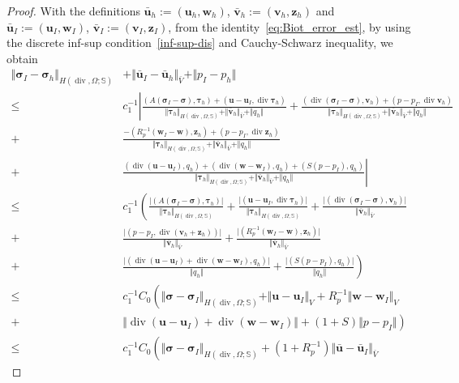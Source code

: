 \documentclass[10pt,a4paper]{amsart}
\def\btau{{\bm \tau}}
\def\bu{{\boldsymbol u}}
\def\bv{{\boldsymbol v}}
\def\bw{{\boldsymbol w}}
\def\bz{\boldsymbol z}
\renewcommand{\div}{\operatorname{div}}
\def\sig{{\bm \sigma}}
\begin{document}
\begin{proof}
With the definitions $\bar{\bu}_h :=(\bu_h,\bw_h)$, $\bar{\bv}_h :=(\bv_h,\bz_h)$ and $\bar{\bu}_I :=(\bu_I,\bw_I)$, $\bar{\bv}_I :=(\bv_I,\bz_I)$, from the identity~\eqref{eq:Biot_error_est}, by using the discrete inf-sup condition~\eqref{inf-sup-dis} and Cauchy-Schwarz inequality, we obtain
%
\begin{align*}
\Vert \sig_I - \sig_h \Vert_{H(\div,\Omega;\mathbb{S})} &+ \Vert \bar{\bu}_I - \bar{\bu}_h \Vert_{\bar{V}} +  \Vert p_I - p_h \Vert \\
\le &
c_1^{-1} \left\lvert
\frac{(A (\sig_I-\sig), \bm \tau_h) + (\bu-\bu_I,\div \bm \tau_h)}
{\Vert \btau_h \Vert_{H(\div,\Omega;\mathbb{S})}+ \Vert \bar{\bv}_h \Vert_{\bar{V}} + \Vert q_h \Vert} \right. 
+  \frac{(\div (\sig_I-\sig),\bv_h) + (p-p_I, \div \bv_h)}
{\Vert \btau_h \Vert_{H(\div,\Omega;\mathbb{S})}+ \Vert \bar{\bv}_h \Vert_{\bar{V}} + \Vert q_h \Vert}  \\
+ & \frac{-(R_p^{-1}  (\bw_I-\bw), \bz_h) + (p-p_I,\div \bz_h)}
{\Vert \btau_h \Vert_{H(\div,\Omega;\mathbb{S})}+ \Vert \bar{\bv}_h \Vert_{\bar{V}} + \Vert q_h \Vert}  \\
+ & \left. \frac{(\div (\bu-\bu_I), q_h) + (\div (\bw -\bw_I), q_h) + (S (p-p_I),q_h)}
{\Vert \btau_h \Vert_{H(\div,\Omega;\mathbb{S})}+ \Vert \bar{\bv}_h \Vert_{\bar{V}} + \Vert q_h \Vert} \right\rvert \\
\le &
c_1^{-1}  \left(
\frac{\lvert(A (\sig_I-\sig), \bm \tau_h)\rvert}{\Vert \btau_h \Vert_{H(\div,\Omega;\mathbb{S})}}
+ \frac{\lvert(\bu-\bu_I,\div \bm \tau_h)\rvert}{\Vert \btau_h \Vert_{H(\div,\Omega;\mathbb{S})}} \right. 
+  \frac{\lvert(\div (\sig_I-\sig),\bv_h)\rvert}{\Vert \bar{\bv}_h \Vert_{\bar{V}}}\\
+& \frac{\lvert(p-p_I, \div (\bv_h + \bz_h))\rvert}{\Vert \bar{\bv}_h \Vert_{\bar{V}}} 
+  \frac{\lvert(R_p^{-1}(\bw_I-\bw), \bz_h)\rvert}{\Vert \bar{\bv}_h \Vert_{\bar{V}}} \\
+ & \left. \frac{\lvert(\div (\bu-\bu_I) + \div (\bw-\bw_I), q_h)\rvert}{\Vert q_h \Vert}
+ \frac{\lvert (S (p-p_I),q_h)\rvert}{\Vert q_h \Vert} \right) \\
\le & c_1^{-1}C_0
\left(
\Vert \sig - \sig_I \Vert_{H(\div,\Omega;\mathbb{S})}
+ \Vert \bu - \bu_I \Vert_V 
+ R_p^{-1} \Vert \bw - \bw_I \Vert_V \right. \\
+ &  \left. \Vert \div (\bu-\bu_I) + \div (\bw-\bw_I) \Vert + (1+S) \Vert p-p_I \Vert \right) \\
\le &  c_1^{-1}C_0
 \left(
\Vert \sig - \sig_I \Vert_{H(\div,\Omega;\mathbb{S})}
+ (1+R_p^{-1}) \Vert \bar{\bu} - \bar{\bu}_I \Vert_{\bar{V }}

\end{align*}
\end{proof}
\end{document}
